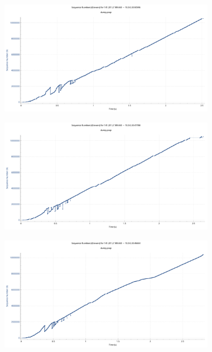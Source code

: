 \documentclass[
    pdftex,
    12pt,
    parskip=half,
    a4paper
]{scrartcl}
\begin{document}
\begin{figure}
\begin{subfigure}{0.5\textwidth}
	\end{subfigure}
	\begin{subfigure}{0.5\textwidth}
		\includegraphics[width=1\textwidth]{../1/wireshark/constant7.pdf}
	\end{subfigure}
	\begin{subfigure}{0.5\textwidth}
		\includegraphics[width=1\textwidth]{../1/wireshark/constant8.pdf}
	\end{subfigure}
	\begin{subfigure}{0.5\textwidth}
		\includegraphics[width=1\textwidth]{../1/wireshark/constant9.pdf}

\end{subfigure}
\end{figure}
\end{document}
